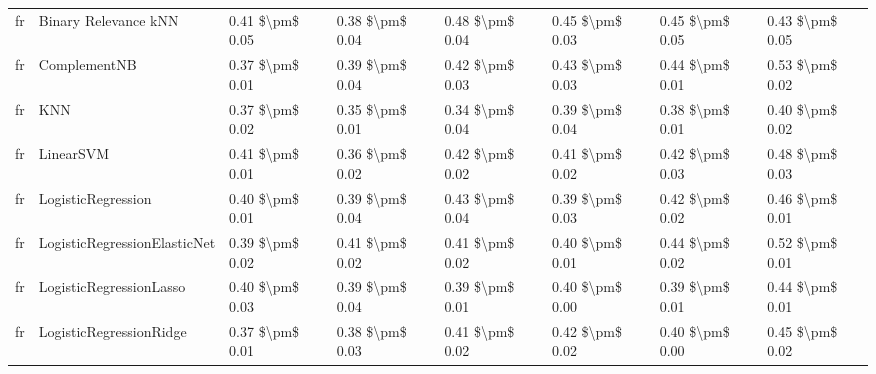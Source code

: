 \begin{tabular}{llllllll}
      fr &            Binary Relevance kNN & 0.41 \$\textbackslash pm\$ 0.05 &           0.38 \$\textbackslash pm\$ 0.04 &       0.48 \$\textbackslash pm\$ 0.04 &        0.45 \$\textbackslash pm\$ 0.03 &                         0.45 \$\textbackslash pm\$ 0.05 &     0.43 \$\textbackslash pm\$ 0.05 \\
      fr &                    ComplementNB & 0.37 \$\textbackslash pm\$ 0.01 &           0.39 \$\textbackslash pm\$ 0.04 &       0.42 \$\textbackslash pm\$ 0.03 &        0.43 \$\textbackslash pm\$ 0.03 &                         0.44 \$\textbackslash pm\$ 0.01 &     0.53 \$\textbackslash pm\$ 0.02 \\
      fr &                             KNN & 0.37 \$\textbackslash pm\$ 0.02 &           0.35 \$\textbackslash pm\$ 0.01 &       0.34 \$\textbackslash pm\$ 0.04 &        0.39 \$\textbackslash pm\$ 0.04 &                         0.38 \$\textbackslash pm\$ 0.01 &     0.40 \$\textbackslash pm\$ 0.02 \\
      fr &                       LinearSVM & 0.41 \$\textbackslash pm\$ 0.01 &           0.36 \$\textbackslash pm\$ 0.02 &       0.42 \$\textbackslash pm\$ 0.02 &        0.41 \$\textbackslash pm\$ 0.02 &                         0.42 \$\textbackslash pm\$ 0.03 &     0.48 \$\textbackslash pm\$ 0.03 \\
      fr &              LogisticRegression & 0.40 \$\textbackslash pm\$ 0.01 &           0.39 \$\textbackslash pm\$ 0.04 &       0.43 \$\textbackslash pm\$ 0.04 &        0.39 \$\textbackslash pm\$ 0.03 &                         0.42 \$\textbackslash pm\$ 0.02 &     0.46 \$\textbackslash pm\$ 0.01 \\
      fr &    LogisticRegressionElasticNet & 0.39 \$\textbackslash pm\$ 0.02 &           0.41 \$\textbackslash pm\$ 0.02 &       0.41 \$\textbackslash pm\$ 0.02 &        0.40 \$\textbackslash pm\$ 0.01 &                         0.44 \$\textbackslash pm\$ 0.02 &     0.52 \$\textbackslash pm\$ 0.01 \\
      fr &         LogisticRegressionLasso & 0.40 \$\textbackslash pm\$ 0.03 &           0.39 \$\textbackslash pm\$ 0.04 &       0.39 \$\textbackslash pm\$ 0.01 &        0.40 \$\textbackslash pm\$ 0.00 &                         0.39 \$\textbackslash pm\$ 0.01 &     0.44 \$\textbackslash pm\$ 0.01 \\
      fr &         LogisticRegressionRidge & 0.37 \$\textbackslash pm\$ 0.01 &           0.38 \$\textbackslash pm\$ 0.03 &       0.41 \$\textbackslash pm\$ 0.02 &        0.42 \$\textbackslash pm\$ 0.02 &                         0.40 \$\textbackslash pm\$ 0.00 &     0.45 \$\textbackslash pm\$ 0.02 \\

\end{tabular}
